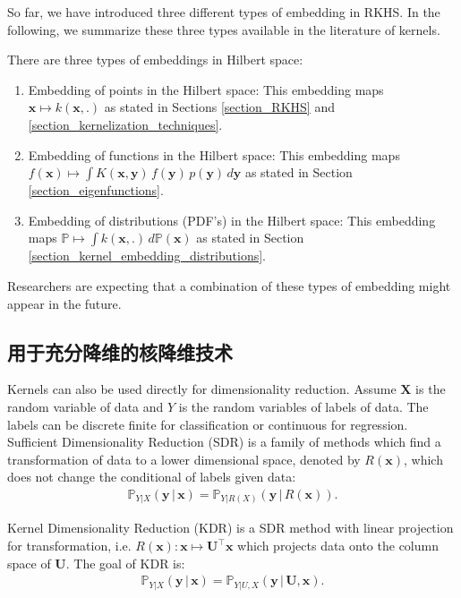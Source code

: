 \documentclass[lang=cn,10pt]{gorgeousnbook}
\numberwithin{equation}{section}%
\numberwithin{figure}{section}%
\begin{document}
So far, we have introduced three different types of embedding in RKHS. In the following, we summarize these three types available in the literature of kernels. 
\begin{remark}
There are three types of embeddings in Hilbert space:
\begin{enumerate}[topsep=0pt,itemsep=-1ex,partopsep=1ex,parsep=1ex]
\item Embedding of points in the Hilbert space: This embedding maps $\boldsymbol{x} \mapsto k(\boldsymbol{x},.)$ as stated in Sections \ref{section_RKHS} and \ref{section_kernelization_techniques}. 
\item Embedding of functions in the Hilbert space: This embedding maps $f(\boldsymbol{x}) \mapsto \int K(\boldsymbol{x},\boldsymbol{y})\, f(\boldsymbol{y})\, p(\boldsymbol{y})\, d\boldsymbol{y}$ as stated in Section \ref{section_eigenfunctions}.
\item Embedding of distributions (PDF's) in the Hilbert space: This embedding maps $\mathbb{P} \mapsto \int k(\boldsymbol{x}, .)\, d\mathbb{P}(\boldsymbol{x})$ as stated in Section \ref{section_kernel_embedding_distributions}.
\end{enumerate}
Researchers are expecting that a combination of these types of embedding might appear in the future. 
\end{remark}


\subsection{用于充分降维的核降维技术}

Kernels can also be used directly for dimensionality reduction.
Assume $\boldsymbol{X}$ is the random variable of data and $Y$ is the random variables of labels of data. The labels can be discrete finite for classification or continuous for regression. 
Sufficient Dimensionality Reduction (SDR) \cite{adragni2009sufficient} is a family of methods which find a transformation of data to a lower dimensional space, denoted by $R(\boldsymbol{x})$, which does not change the conditional of labels given data:
\begin{align}
\mathbb{P}_{Y | X}(\boldsymbol{y}\, |\, \boldsymbol{x}) = \mathbb{P}_{Y | R(X)}(\boldsymbol{y}\, |\, R(\boldsymbol{x})).
\end{align}

Kernel Dimensionality Reduction (KDR) \cite{fukumizu2004dimensionality,fukumizu2009kernel,wang2010unsupervised} is a SDR method with linear projection for transformation, i.e. $R(\boldsymbol{x}): \boldsymbol{x} \mapsto \boldsymbol{U}^\top \boldsymbol{x}$ which projects data onto the column space of $\boldsymbol{U}$. The goal of KDR is:
\begin{align}
\mathbb{P}_{Y | X}(\boldsymbol{y}\, |\, \boldsymbol{x}) = \mathbb{P}_{Y | U, X}(\boldsymbol{y}\, |\, \boldsymbol{U}, \boldsymbol{x}).
\end{align}
\end{document}
